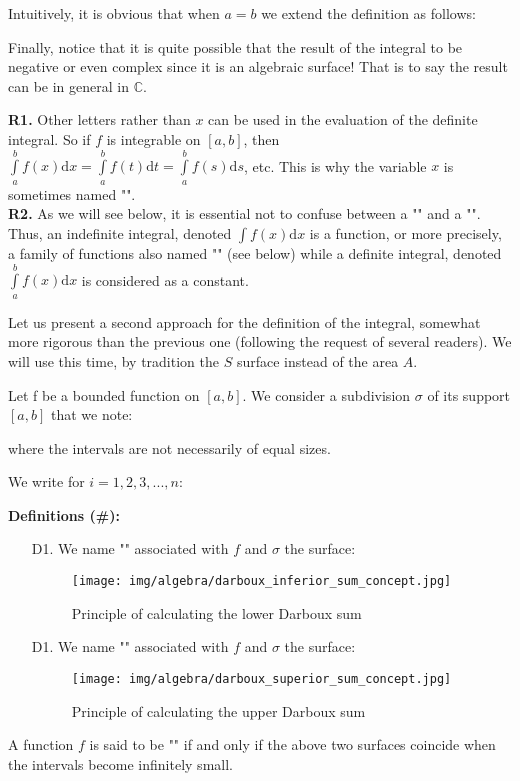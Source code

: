 		Intuitively, it is obvious that when $a=b$ we extend the definition as follows:
		
		Finally, notice that it is quite possible that the result of the integral to be negative or even complex since it is an algebraic surface! That is to say the result can be in general in $\mathbb{C}$.
	\begin{tcolorbox}[title=Remarks,colframe=black,arc=10pt]
	\textbf{R1.} Other letters rather than $x$ can be used in the evaluation of the definite integral. So if $f$ is integrable on $[a, b]$, then $\int\limits_a^bf(x)\mathrm{d}x=\int\limits_a^bf(t)\mathrm{d}t=\int\limits_a^bf(s)\mathrm{d}s$, etc. This is why the variable $x$ is sometimes named "".\\

	\textbf{R2.} As we will see below, it is essential not to confuse between a "" and a "". Thus, an indefinite integral, denoted $\int\limits f(x)\mathrm{d}x$ is a function, or more precisely, a family of functions also named "" (see below) while a definite integral, denoted $\int\limits_a^b f(x)\mathrm{d}x$ is considered as a constant.
	\end{tcolorbox}
	Let us present a second approach for the definition of the integral, somewhat more rigorous than the previous one  (following the request of several readers). We will use this time, by tradition the $S$ surface instead of the area $A$.
	
	Let f be a bounded function on $[a, b]$. We consider a subdivision $\sigma$ of its support $[a, b]$ that we note:
	
	where the intervals are not necessarily of equal sizes.

	We write for $i=1,2,3,...,n$:	
	
	
	\textbf{Definitions (\#\mydef):}
	\begin{enumerate}
		\item[D1.] We name "" associated with $f$ and $\sigma$ the surface:
		
		\begin{figure}[H]
			\centering
			\texttt{[image: img/algebra/darboux\_inferior\_sum\_concept.jpg]}
			\caption{Principle of calculating the lower Darboux sum}
		\end{figure}
		\item[D1.] We name "" associated with $f$ and $\sigma$ the surface:
		
		\begin{figure}[H]
			\centering
			\texttt{[image: img/algebra/darboux\_superior\_sum\_concept.jpg]}
			\caption{Principle of calculating the upper Darboux sum}
		\end{figure}
	\end{enumerate}
	A function $f$ is said to be "" if and only if the above two surfaces coincide when the intervals become infinitely small.
	
